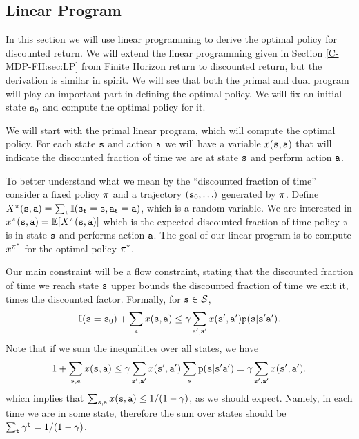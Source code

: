 \begin{leftbar}
\section{Linear Program}
\label{chapter-discount:section:LP}




In this section we will use linear programming to derive the optimal
policy for discounted return.
%
We will extend the linear programming given in Section
\ref{C-MDP-FH:sec:LP} from Finite Horizon return to discounted
return, but the derivation is similar in spirit.
%
%
We will see that both the primal and dual program will play an
important part in defining the optimal policy. We will fix an
initial state ${\tt s}_0$ and compute the optimal policy for it.

We will start with the primal linear program, which will compute the
optimal policy. For each state ${\tt s}$ and action ${\tt a}$ we will
have a variable $x({\tt s},{\tt a})$ that will indicate the
discounted fraction of time we are at state ${\tt s}$ and perform
action ${\tt a}$.

To better understand what we mean by the ``discounted fraction of
time'' consider a fixed policy $\pi$ and a trajectory
$({\tt s}_0, \ldots )$ generated by $\pi$. Define
$X^\pi({\tt s},{\tt a})=\sum_{\tt t}
\mathbb{I}({\tt s}_{\tt t}={\tt s},{\tt a}_{\tt t}={\tt a})$, which is a random
variable. We are interested in
$x^\pi({\tt s},{\tt a})=\mathbb{E}[X^\pi({\tt s},{\tt a})]$ which is
the expected discounted fraction of time policy $\pi$ is in
state ${\tt s}$ and performs action ${\tt a}$. The goal of our linear
program is to compute $x^{\pi^*}$ for the optimal policy
$\pi^*$.

Our main constraint will be a flow constraint, stating that the
discounted fraction of time we reach state ${\tt s}$ upper bounds the
discounted fraction of time we exit it, times the discounted factor.
Formally, for ${\tt s}\in\mathcal{S}$,
\[
\mathbb{I}({\tt s}={\tt s}_0)+\sum_{{\tt a}} x({\tt s},{\tt a})\leq \gamma
\sum_{{\tt s}',{\tt a}'}
x({\tt s}',{\tt a}'){\tt p}({\tt s}|{\tt s}'{\tt a}').
\]
Note that if we sum the inequalities over all states, we have
\[
1+\sum_{{\tt s},{\tt a}} x({\tt s},{\tt a})\leq\gamma
\sum_{{\tt s}',{\tt a}'} x({\tt s}',{\tt a}')\sum_{\tt s}
{\tt p}({\tt s}|{\tt s}'{\tt a}')=\gamma \sum_{{\tt s}',{\tt a}'}
x({\tt s}',{\tt a}').\]
%
which implies that $\sum_{{\tt s},{\tt a}} x({\tt s},{\tt a})\leq
1/(1-\gamma)$, as we should expect. Namely, in each time we are
in some state, therefore the sum over states should be $\sum_{\tt t}
\gamma^{\tt t}=1/(1-\gamma)$.


\end{leftbar}
